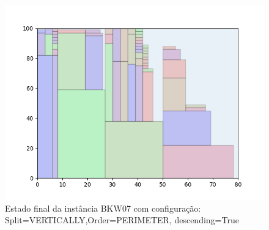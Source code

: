 \begin{figure}[H]
    \centering
    \caption[]{Estado final da instância BKW07 com configuração: Split=VERTICALLY,Order=PERIMETER, descending=True}
    \label{fig:bkw07-vertically-perimeter-true}
    \includegraphics[scale=0.5]{output/figures/bkw/bkw07/vertically/perimeter/true/00}
\end{figure}